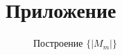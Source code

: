 \section*{Приложение}
\label{sec:Apendix} 
\large

\begin{figure}[th]
\noindent{}
\caption{Построение $\{ |M_m|\} $}
\label{figCurves}
\end{figure}